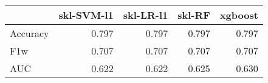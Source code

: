 \begin{tabular}{lrrrr}
\toprule
{} &  skl-SVM-l1 &  skl-LR-l1 &  skl-RF &  xgboost \\
\midrule
Accuracy &       0.797 &      0.797 &   0.797 &    0.797 \\
F1w      &       0.707 &      0.707 &   0.707 &    0.707 \\
AUC      &       0.622 &      0.622 &   0.625 &    0.630 \\
\bottomrule
\end{tabular}
